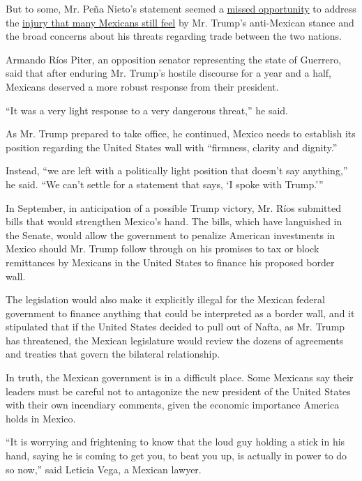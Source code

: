 But to some, Mr. Peña Nieto's statement seemed a
\href{http://www.nytimes.com/2016/09/01/world/americas/trump-mexico-pena-nieto-reaction.html}{missed
opportunity} to address the
\href{http://www.nytimes.com/2016/09/08/world/americas/mexico-finance-minister-luis-videgaray-resigns.html}{injury
that many Mexicans still feel} by Mr. Trump's anti-Mexican stance and
the broad concerns about his threats regarding trade between the two
nations.

Armando Ríos Piter, an opposition senator representing the state of
Guerrero, said that after enduring Mr. Trump's hostile discourse for a
year and a half, Mexicans deserved a more robust response from their
president.

``It was a very light response to a very dangerous threat,'' he said.

As Mr. Trump prepared to take office, he continued, Mexico needs to
establish its position regarding the United States wall with ``firmness,
clarity and dignity.''

Instead, ``we are left with a politically light position that doesn't
say anything,'' he said. ``We can't settle for a statement that says, `I
spoke with Trump.'''

In September, in anticipation of a possible Trump victory, Mr. Ríos
submitted bills that would strengthen Mexico's hand. The bills, which
have languished in the Senate, would allow the government to penalize
American investments in Mexico should Mr. Trump follow through on his
promises to tax or block remittances by Mexicans in the United States to
finance his proposed border wall.

The legislation would also make it explicitly illegal for the Mexican
federal government to finance anything that could be interpreted as a
border wall, and it stipulated that if the United States decided to pull
out of Nafta, as Mr. Trump has threatened, the Mexican legislature would
review the dozens of agreements and treaties that govern the bilateral
relationship.

In truth, the Mexican government is in a difficult place. Some Mexicans
say their leaders must be careful not to antagonize the new president of
the United States with their own incendiary comments, given the economic
importance America holds in Mexico.

``It is worrying and frightening to know that the loud guy holding a
stick in his hand, saying he is coming to get you, to beat you up, is
actually in power to do so now,'' said Leticia Vega, a Mexican lawyer.

